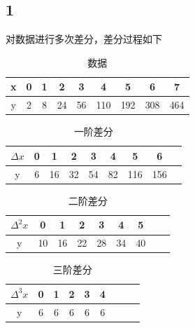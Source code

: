 \documentclass{article}
\begin{document}
\subsection{1}

对数据进行多次差分，差分过程如下

\begin{table}[!h]
\begin{center}
\begin{tabular}{c|c c c c c c c c}
    x & 0 & 1 & 2 & 3 & 4 & 5 & 6 & 7  \\
    \hline
    y & 2 & 8 & 24 & 56 & 110 & 192 & 308 & 464 \\
\end{tabular}
\caption{\label{demo-table}数据}
\end{center}
\end{table}

\begin{table}[!h]
\begin{center}
\begin{tabular}{c|c c c c c c c c}
    $\Delta x$ & 0 & 1 & 2 & 3 & 4 & 5 & 6  \\
    \hline
    y & 6 & 16 & 32 & 54 & 82 & 116 & 156 \\
\end{tabular}
\caption{\label{demo-table}一阶差分}
\end{center}
\end{table}

\newpage

\begin{table}[!h]
\begin{center}
\begin{tabular}{c|c c c c c c c c}
    $\Delta^2 x$ & 0 & 1 & 2 & 3 & 4 & 5  \\
    \hline
    y & 10 & 16 & 22 & 28 & 34 & 40 \\
\end{tabular}
\caption{\label{demo-table}二阶差分}
\end{center}
\end{table}

\begin{table}[!h]
\begin{center}
\begin{tabular}{c|c c c c c c c c}
    $\Delta^3 x$ & 0 & 1 & 2 & 3 & 4  \\
    \hline
    y & 6 & 6 & 6 & 6 & 6 \\
\end{tabular}
\caption{\label{demo-table}三阶差分}
\end{center}
\end{table}
\end{document}
